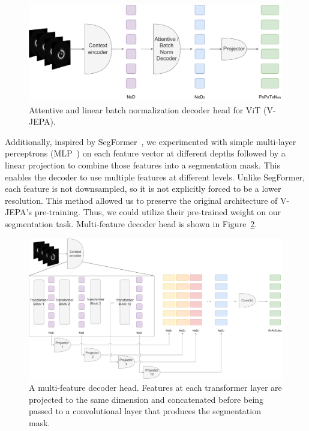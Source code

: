 \documentclass[a4paper,11pt,oneside]{report}
\begin{document}
\begin{figure}[ht]
    \centering
    \includegraphics[width=0.6\linewidth]{figures/fig_implementation_vjepa_attentive_and_batchnorm_decoder.pdf}
    \caption{Attentive and linear batch normalization decoder head for ViT (V-JEPA).}
    \label{fig:vjepa-attentive-and-batchnorm-decoder-head}
\end{figure}%

Additionally, inspired by SegFormer~\cite{Xie2021SegFormer}, we experimented with simple multi-layer perceptrons (MLP~\cite{Rumelhart1986}) on each feature vector at different depths followed by a linear projection to combine those features into a segmentation mask. This enables the decoder to use multiple features at different levels. Unlike SegFormer, each feature is not downsampled, so it is not explicitly forced to be a lower resolution. This method allowed us to preserve the original architecture of V-JEPA's pre-training. Thus, we could utilize their pre-trained weight on our segmentation task. Multi-feature decoder head is shown in Figure~\ref{fig:vjepa-multi-feature-decoder-head}.

\begin{figure}[ht]
    \centering
    \includegraphics[width=1.0\linewidth]{figures/fig_implementation_vjepa_multifeat.pdf}
    \caption{A multi-feature decoder head. Features at each transformer layer are projected to the same dimension and concatenated before being passed to a convolutional layer that produces the segmentation mask.}
    \label{fig:vjepa-multi-feature-decoder-head}
\end{figure}
\end{document}
